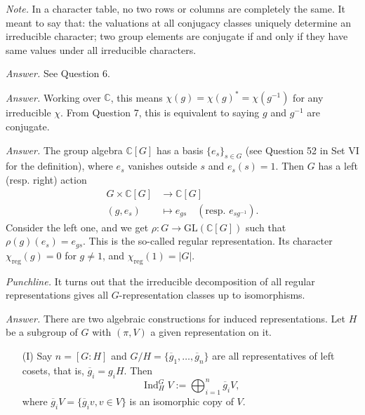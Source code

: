 \documentclass{mathproblems}
\newcommand\C{\mathbb{C}}
\newcommand\GL{\mathrm{GL}}
\DeclareMathOperator{\Ind}{Ind}
\begin{document}
\begin{questions}
\textit{Note.} In a character table, no two rows or columns are completely the same. It meant to say that: the valuations at all conjugacy classes uniquely determine an irreducible character; two group elements are conjugate if and only if they have same values under all irreducible characters.


\textit{Answer.} See Question 6.


\textit{Answer.} Working over $\C$, this means $\chi(g)=\chi(g)^*=\chi(g^{-1})$ for any irreducible $\chi$. From Question 7, this is equivalent to saying $g$ and $g^{-1}$ are conjugate.


\textit{Answer.} The group algebra $\C[G]$ has a basis $\{e_s\}_{s\in G}$ (see Question 52 in Set VI for the definition), where $e_s$ vanishes outside $s$ and $e_s(s)=1$. Then $G$ has a left (resp. right) action
$$
\begin{aligned}
G\times \C[G] & \longrightarrow \C[G]\\
(g,e_s) & \longmapsto e_{g s} \quad (\text{resp. } e_{s g^{-1}}).
\end{aligned}
$$
Consider the left one, and we get $\rho: G\to \GL(\C[G])$ such that $\rho(g)(e_s)=e_{g s}$. This is the so-called regular representation. Its character $\chi_{\mathrm{reg}}(g)=0$ for $g\neq 1$, and $\chi_{\mathrm{reg}}(1)=|G|$.

\textit{Punchline.} It turns out that the irreducible decomposition of all regular representations gives all $G$-representation classes up to isomorphisms.


\textit{Answer.} There are two algebraic constructions for induced representations. Let $H$ be a subgroup of $G$ with $(\pi,V)$ a given representation on it.
\begin{itemize}
\item[(I)] Say $n=[G:H]$ and $G/H=\{\overline{g}_1,\ldots,\overline{g}_n\}$ are all representatives of left cosets, that is, $\overline{g}_i=g_i H$. Then
$$
\Ind_H^G V:=\bigoplus_{i=1}^n \overline{g}_i V,
$$
where $\overline{g}_iV=\{\overline{g}_iv, v\in V\}$ is an isomorphic copy of $V$.


\end{itemize}
\end{questions}
\end{document}
